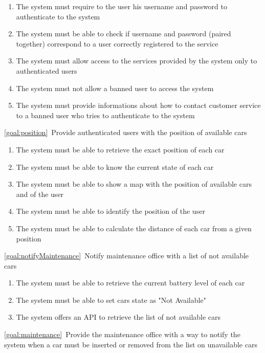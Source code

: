 \begin{description}
\begin{enumerate}[label=\textbf{R\arabic*}]
  				\item The system must require to the user his username and password to authenticate to the system
   				\item The system must be able to check if username and password (paired together) correspond to a user
   				correctly registered to the service
   				\item The system must allow access to the services provided by the system only to authenticated users 
   				\item The system must not allow a banned user to access the system
   				\item The system must provide informations about how to contact customer service to a banned user who
   				tries to authenticate to the system
			\end{enumerate}
		\item \ref{goal:position}\ Provide authenticated users with the position of available cars
			\begin{enumerate}[label=\textbf{R\arabic*}]
  				\item The system must be able to retrieve the exact position of each car
   				\item The system must be able to know the current state of each car
   				\item The system must be able to show a map with the position of available cars and of the user
  				\item The system must be able to identify the position of the user
   				\item The system must be able to calculate the distance of each car from a given position
  			\end{enumerate}
		\item \ref{goal:notifyMaintenance}\ Notify maintenance office with a list of not available cars
			\begin{enumerate}[label=\textbf{R\arabic*}]
   				\item The system must be able to retrieve the current battery level of each car
   				\item The system must be able to set cars state as "Not Available"
   				\item The system offers an API to retrieve the list of not available cars
  			\end{enumerate}
		\item \ref{goal:maintenance}\ Provide the maintenance office with a way to notify the system when a car must 
		be inserted or removed from the list on unavailable cars

\end{description}
